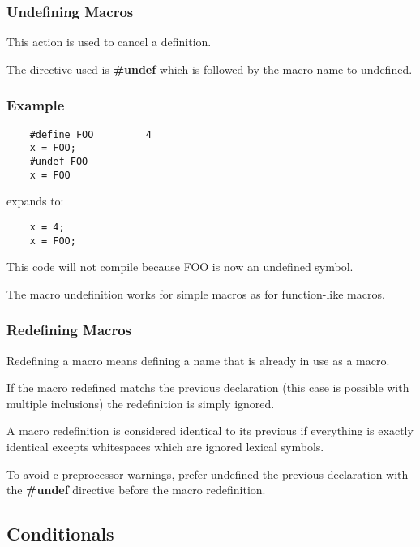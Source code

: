 \documentclass[9pt]{beamer}
\newcommand{\nl}[0]{\vspace{0.4cm}}
\begin{document}

\begin{frame}
  \frametitle{Undefining Macros}

  This action is used to cancel a definition.

  \nl

  The directive used is \textbf{\#undef} which is followed by the macro
  name to undefined.
\end{frame}


\begin{frame}[containsverbatim]
  \frametitle{Example}

  \begin{verbatim}
    #define FOO         4
    x = FOO;
    #undef FOO
    x = FOO
  \end{verbatim}

  expands to:

  \begin{verbatim}
    x = 4;
    x = FOO;
  \end{verbatim}

  This code will not compile because FOO is now an undefined symbol.

  \nl

  The macro undefinition works for simple macros as for function-like macros.
\end{frame}


\begin{frame}
  \frametitle{Redefining Macros}

  Redefining a macro means defining a name that is already in use as a macro.

  \nl

  If the macro redefined matchs the previous declaration (this case is possible
  with multiple inclusions) the redefinition is simply ignored.

  \nl

  A macro redefinition is considered identical to its previous if everything is
  exactly identical excepts whitespaces which are ignored lexical symbols.

  \nl

  To avoid c-preprocessor warnings, prefer undefined the previous declaration
  with the \textbf{\#undef} directive before the macro redefinition.
\end{frame}

%
%

\subsection{Conditionals}
\end{document}
